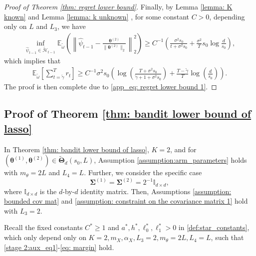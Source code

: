\documentclass[aos,preprint]{imsart}
\theoremstyle{plain}
\theoremstyle{definition}
\newcommand{\bTheta}{\boldsymbol{\Theta}}
\newcommand{\btheta}{\boldsymbol{\theta}}
\newcommand{\bSigma}{\boldsymbol{\Sigma}}
\newcommand{\Exp}{\mathbb{E}}
\begin{document}
\begin{appendix}
\begin{proof}[Proof of Theorem \ref{thm: regret lower bound}]
Finally, by Lemma \ref{lemma: K known} and Lemma \ref{lemma: k unknown} ,  for some constant $C > 0$, depending only on $L$ and $L_3$, we have
\begin{align*}
    \inf_{\hat{\psi}_{t-1} \in  {\tilde{\mathcal{H}}}_{t-1}} \Exp_{\tilde{\omega}}\left(\left\|\hat{\psi}_{t-1}-\frac{\btheta^{(2)}}{\|\btheta^{(2)}\|_2} \right\|_2^2 \right) \geq C^{-1}  \left(\frac{\sigma^2 s_0}{t+\sigma^2s_0} + \frac{\sigma^2}{T}s_0\log\frac{d}{s_0} \right),
\end{align*}
which implies that
\begin{align*}
\Exp_{\tilde{\omega}}\left[\sum_{t=\tilde{\gamma}}^{T} r_t \right] \geq C^{-1} \sigma^2 s_0 \left(\log\left( \frac{T + \sigma^2 s_0}{ \tilde{\gamma} +1+ \sigma^2 s_0} \right) + \frac{T - \tilde{\gamma}}{T} \log\left( \frac{d}{s_0}\right) \right).
\end{align*}
The proof is then complete due to \eqref{app_eq: regret lower bound 1}.
\end{proof}


\subsection{Proof of Theorem \ref{thm: bandit lower bound of lasso}}\label{sec: proof of thm: bandit lower bound of lasso}
In Theorem \ref{thm: bandit lower bound of lasso}, $K = 2$, and   for $(\btheta^{(1)}, \btheta^{(2)}) \in \widetilde{\bTheta}_{d}(s_0,L)$, Assumption \ref{assumption:arm_parameters} holds with $m_{\theta} = 2L$ and $L_4 = L$. Further, we consider the specific case
$$\bSigma^{(1)} = \bSigma^{(2)} = 2^{-1} \mathbb{I}_{d \times d},$$
where $\mathbb{I}_{d \times d}$ is the $d$-by-$d$ identity matrix. Then,
 Assumptions \ref{assumption: bounded cov mat} and \ref{assumption: constraint on the covariance matrix 1} hold with $L_3=2$.


Recall the fixed constants  $C^* \geq 1$ and $a^*, h^*, \ell_0^*, \ell_1^* > 0$  in \eqref{def:star_constants}, which only depend only on $K=2,  m_X, \alpha_X,  L_3 = 2, m_{\theta} = 2L, L_4 = L$, such that \eqref{stage 2:aux_eq1}-\eqref{eq: margin} hold. 


\end{appendix}
\end{document}
